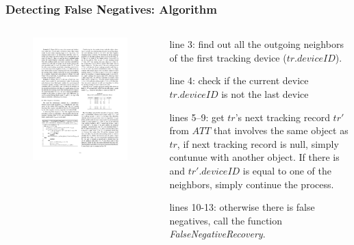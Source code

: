 
\begin{frame}
\frametitle{Detecting False Negatives: Algorithm}

\begin{columns}

  \begin{figure}[tb]
    \includegraphics[width=\columnwidth]{figures/3-3/3-3-7.pdf}
  \end{figure}

  \begin{sitemize}
    \item line 3: find out all the outgoing neighbors of the first tracking device ($tr.deviceID$).
    \item line 4: check if the current device $tr.deviceID$ is not the last device
    \item lines 5--9: get $tr$'s next tracking record $tr'$ from $ATT$ that involves the same object as $tr$, if next tracking record is null, simply contunue with another object. If there is and $tr'.deviceID$ is equal to one of the neighbors, simply continue the process.
    \item lines 10-13: otherwise there is false negatives, call the function \emph{FalseNegativeRecovery}.
  \end{sitemize}

\end{columns}

\end{frame}

